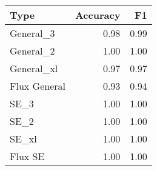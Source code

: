 \begin{tabular}{lrr}
\toprule
Type & Accuracy & F1 \\
\midrule
General_3 & 0.98 & 0.99 \\
General_2 & 1.00 & 1.00 \\
General_xl & 0.97 & 0.97 \\
Flux General & 0.93 & 0.94 \\
SE_3 & 1.00 & 1.00 \\
SE_2 & 1.00 & 1.00 \\
SE_xl & 1.00 & 1.00 \\
Flux SE & 1.00 & 1.00 \\
\bottomrule
\end{tabular}
